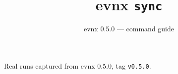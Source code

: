 \documentclass[aspectratio=169,10pt]{beamer}
\title{evnx \texttt{sync}}
\subtitle{evnx 0.5.0 — command guide}
\date{}
\begin{document}
\begin{frame}[plain]\titlepage
  \begin{center}\footnotesize
  \textcolor{evnxMuted}{Real runs captured from evnx 0.5.0, tag \texttt{v0.5.0}.}
  \end{center}
\end{frame}

\end{document}
